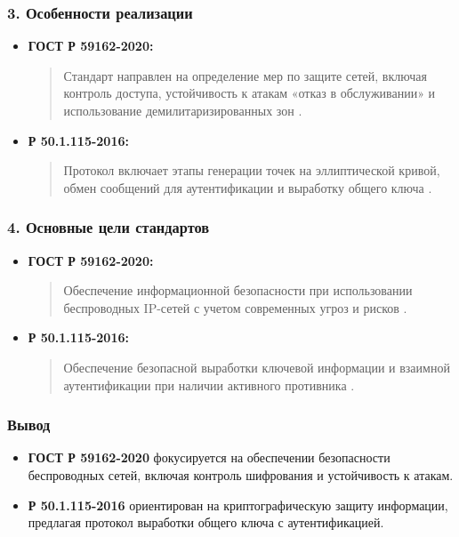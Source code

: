 \subsubsection*{3. Особенности реализации}

\begin{itemize}
    \item \textbf{ГОСТ Р 59162-2020:}
    \begin{quote}
        Стандарт направлен на определение мер по защите сетей, включая контроль доступа, устойчивость к атакам «отказ в обслуживании» и использование демилитаризированных зон \cite[стр.~16]{gost_r_59162}.
    \end{quote}

    \item \textbf{Р 50.1.115-2016:}
    \begin{quote}
        Протокол включает этапы генерации точек на эллиптической кривой, обмен сообщений для аутентификации и выработку общего ключа \cite[стр.~4]{r_50_1_115}.
    \end{quote}
\end{itemize}

\subsubsection*{4. Основные цели стандартов}

\begin{itemize}
    \item \textbf{ГОСТ Р 59162-2020:}
    \begin{quote}
        Обеспечение информационной безопасности при использовании беспроводных IP-сетей с учетом современных угроз и рисков \cite[стр.~IV]{gost_r_59162}.
    \end{quote}

    \item \textbf{Р 50.1.115-2016:}
    \begin{quote}
        Обеспечение безопасной выработки ключевой информации и взаимной аутентификации при наличии активного противника \cite[стр.~1]{r_50_1_115}.
    \end{quote}
\end{itemize}

\subsubsection*{Вывод}

\begin{itemize}
    \item \textbf{ГОСТ Р 59162-2020} фокусируется на обеспечении безопасности беспроводных сетей, включая контроль шифрования и устойчивость к атакам.
    \item \textbf{Р 50.1.115-2016} ориентирован на криптографическую защиту информации, предлагая протокол выработки общего ключа с аутентификацией.
\end{itemize}

